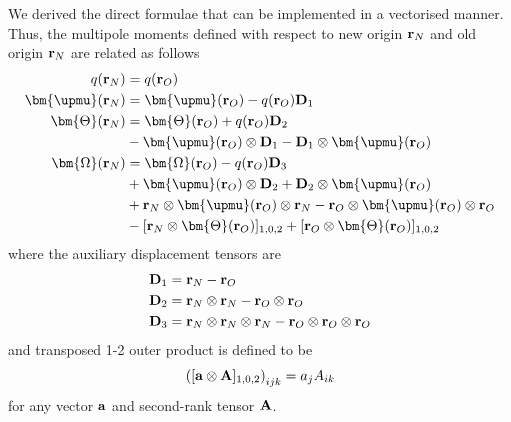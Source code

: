 \documentclass[a4paper,titlepage,twoside,fleqn,12pt]{book}
\newcommand{\BM}[1]{\bm{#1}}
\begin{document}
\begin{appendices}
\begin{refsection}
We derived the direct formulae that can be implemented in a vectorised manner. 
Thus, the multipole moments
defined with respect to new origin ${\bf r}_N$ and old origin ${\bf r}_N$ are related as follows
%
\begin{subequations}
\begin{align}
q({\bf r}_N)               &= q({\bf r}_O)  \\
{\BM \upmu}({\bf r}_N)       &= {\BM \upmu}({\bf r}_O) - q({\bf r}_O) {\bf D}_1 \\ 
{\BM \Theta}({\bf r}_N)    &= {\BM \Theta}({\bf r}_O) + q({\bf r}_O) {\bf D}_2 \nonumber \\  
 &- {\BM \upmu}({\bf r}_O) \otimes {\bf D}_1 - {\bf D}_1 \otimes {\BM \upmu}({\bf r}_O)  \\  
{\BM \Omega}({\bf r}_N)    &= {\BM \Omega}({\bf r}_O) - q({\bf r}_O) {\bf D}_3 \nonumber \\ 
 &+ {\BM \upmu}({\bf r}_O) \otimes {\bf D}_2 + {\bf D}_2 \otimes {\BM \upmu}({\bf r}_O) \nonumber \\ 
 &+ {\bf r}_N \otimes {\BM \upmu}({\bf r}_O) \otimes {\bf r}_N - {\bf r}_O \otimes {\BM \upmu}({\bf r}_O) \otimes {\bf r}_O \nonumber \\ 
 &- [{\bf r}_N \otimes {\BM \Theta}({\bf r}_O)]_{1,0,2} + [{\bf r}_O \otimes {\BM \Theta}({\bf r}_O)]_{1,0,2} 
\end{align}
\end{subequations}
%
where the auxiliary displacement tensors are
%
\begin{subequations}
\begin{align}
{\bf D}_1 &= {\bf r}_N - {\bf r}_O \\
{\bf D}_2 &= {\bf r}_N \otimes {\bf r}_N  - {\bf r}_O \otimes {\bf r}_O  \\
{\bf D}_3 &= {\bf r}_N \otimes {\bf r}_N \otimes {\bf r}_N  - {\bf r}_O \otimes {\bf r}_O \otimes {\bf r}_O
\end{align}
\end{subequations}
%
and transposed 1-2 outer product is defined to be
%
\begin{equation}
\left( [{\bf a} \otimes {\bf A} ]_{1,0,2} \right)_{ijk} = a_j A_{ik}
\end{equation}
%
for any vector ${\bf a}$ and second-rank tensor ${\bf A}$.

\printbibliography[heading=subbibintoc,title={References}]
\end{refsection}


\end{appendices}
\end{document}
